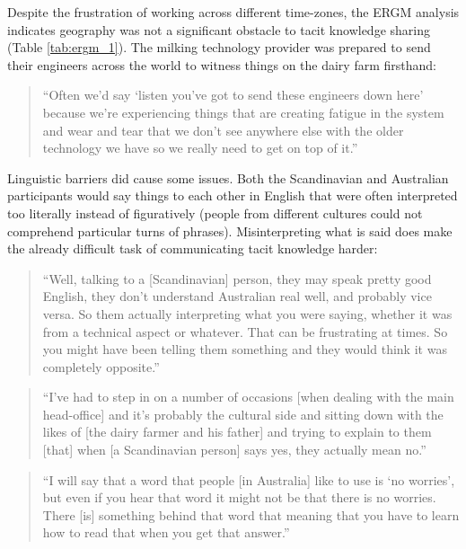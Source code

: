 Despite the frustration of working across different time-zones, the ERGM analysis indicates geography was not a significant obstacle to tacit knowledge sharing (Table \ref{tab:ergm_1}). The milking technology provider was prepared to send their engineers across the world to witness things on the dairy farm firsthand:

\begin{quote}
\small
\enquote{Often we'd say \enquote{listen you've got to send these engineers down here} because we're experiencing things that are creating fatigue in the system and wear and tear that we don't see anywhere else with the older technology we have so we really need to get on top of it.} \\
\end{quote}

Linguistic barriers did cause some issues. Both the Scandinavian and Australian participants would say things to each other in English that were often interpreted too literally instead of figuratively (people from different cultures could not comprehend particular turns of phrases). Misinterpreting what is said does make the already difficult task of communicating tacit knowledge harder:

\begin{quote}
\small
\enquote{Well, talking to a [Scandinavian] person, they may speak pretty good English, they don't understand Australian real well, and probably vice versa. So them actually interpreting what you were saying, whether it was from a technical aspect or whatever. That can be frustrating at times. So you might have been telling them something and they would think it was completely opposite.} \\
\end{quote}

\begin{quote}
\small
\enquote{I've had to step in on a number of occasions [when dealing with the main head-office] and it's probably the cultural side and sitting down with the likes of [the dairy farmer and his father] and trying to explain to them [that] when [a Scandinavian person] says yes, they actually mean no.} \\
\end{quote}

\begin{quote}
\small
\enquote{I will say that a word that people [in Australia] like to use is \enquote{no worries}, but even if you hear that word it might not be that there is no worries. There [is] something behind that word that meaning that you have to learn how to read that when you get that answer.} \\
\end{quote}

